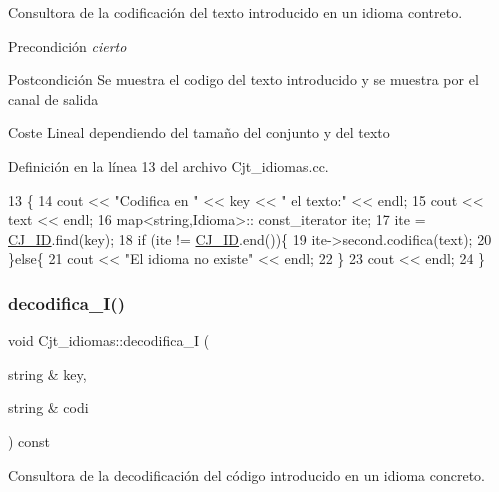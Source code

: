 Consultora de la codificación del texto introducido en un idioma contreto. 

\begin{DoxyPrecond}{Precondición}
{\itshape cierto} 
\end{DoxyPrecond}
\begin{DoxyPostcond}{Postcondición}
Se muestra el codigo del texto introducido y se muestra por el canal de salida 
\end{DoxyPostcond}
\begin{DoxyParagraph}{Coste}
Lineal dependiendo del tamaño del conjunto y del texto 
\end{DoxyParagraph}


Definición en la línea 13 del archivo Cjt\+\_\+idiomas.\+cc.


\begin{DoxyCode}
13                                                            \{
14   cout << \textcolor{stringliteral}{"Codifica en "} << key << \textcolor{stringliteral}{" el texto:"} << endl;
15   cout << text << endl;
16   map<string,Idioma>:: const\_iterator ite;
17   ite = \hyperlink{class_cjt__idiomas_aeb67a7100b1345a160fb85466bd4e5f6}{CJ\_ID}.find(key);
18   \textcolor{keywordflow}{if} (ite != \hyperlink{class_cjt__idiomas_aeb67a7100b1345a160fb85466bd4e5f6}{CJ\_ID}.end())\{
19     ite->second.codifica(text);
20    \}\textcolor{keywordflow}{else}\{
21     cout << \textcolor{stringliteral}{"El idioma no existe"} << endl;
22   \}
23   cout << endl;
24 \}
\end{DoxyCode}
\mbox{\label{class_cjt__idiomas_a99a44238cc4b83392ff1991ad1319c46}} 
\subsubsection{\texorpdfstring{decodifica\+\_\+\+I()}{decodifica\_I()}}
{\footnotesize\ttfamily void Cjt\+\_\+idiomas\+::decodifica\+\_\+I (\begin{DoxyParamCaption}\item[{string \&}]{key,  }\item[{string \&}]{codi }\end{DoxyParamCaption}) const}



Consultora de la decodificación del código introducido en un idioma concreto. 


